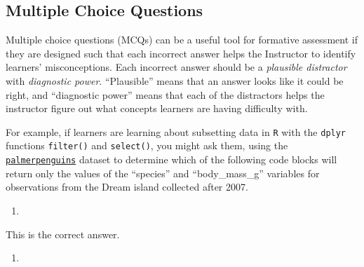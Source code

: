 \documentclass[
]{book}
\newenvironment{Shaded}{\begin{snugshade}}{\end{snugshade}}
\newcommand{\DecValTok}[1]{\textcolor[rgb]{0.00,0.00,0.81}{#1}}
\newcommand{\KeywordTok}[1]{\textcolor[rgb]{0.13,0.29,0.53}{\textbf{#1}}}
\newcommand{\NormalTok}[1]{#1}
\newcommand{\OperatorTok}[1]{\textcolor[rgb]{0.81,0.36,0.00}{\textbf{#1}}}
\newcommand{\StringTok}[1]{\textcolor[rgb]{0.31,0.60,0.02}{#1}}
\begin{document}
\hypertarget{multiple-choice-questions}{%
\subsection{Multiple Choice Questions}\label{multiple-choice-questions}}

Multiple choice questions (MCQs) can be a useful tool for formative assessment if they are
designed such that each incorrect answer helps the Instructor to identify learners'
misconceptions. Each incorrect answer should be a \emph{plausible distractor} with \emph{diagnostic power}.
``Plausible'' means that an answer looks like it could be right, and ``diagnostic power'' means
that each of the distractors helps the instructor figure out
what concepts learners are having difficulty with.

For example, if learners are learning about subsetting data in \texttt{R} with the \texttt{dplyr}
functions \texttt{filter()} and \texttt{select()}, you might ask them, using the \href{https://cran.r-project.org/package=palmerpenguins}{\texttt{palmerpenguins}} dataset to determine which of the
following code blocks will return only the values of the ``species'' and ``body\_mass\_g'' variables
for observations from the Dream island collected after 2007.

\begin{enumerate}
\def\labelenumi{\alph{enumi}.}
\item
\end{enumerate}

\begin{Shaded}
\end{Shaded}

This is the correct answer.

\begin{enumerate}
\def\labelenumi{\alph{enumi}.}
\setcounter{enumi}{1}
\item
\end{enumerate}

\begin{Shaded}
\end{Shaded}
\end{document}
